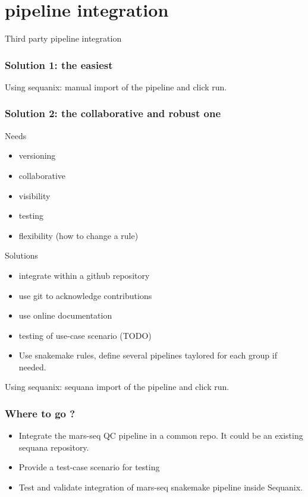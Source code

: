 \documentclass{beamer}
\begin{document}
\section{pipeline integration}

\begin{frame}[plain]
 \centering
 \begin{Huge}
 Third party pipeline integration
 \end{Huge}
\end{frame}


\begin{frame}
\frametitle{Solution 1: the easiest}
Using sequanix: manual import of the pipeline and click run.
\end{frame}

\begin{frame}
\frametitle{Solution 2: the collaborative and robust one}
\begin{block}{Needs}
 \begin{itemize}
  \item versioning
  \item collaborative
  \item visibility
  \item testing
  \item flexibility (how to change a rule)
 \end{itemize}
\end{block}

\begin{block}{Solutions}
 \begin{itemize}

\item integrate within a github repository
 \item use git to acknowledge contributions
 \item use online documentation
 \item testing of use-case scenario (TODO)
 \item Use snakemake rules, define several pipelines taylored for each group if 
needed.
 \end{itemize}
\end{block}
Using sequanix: sequana import of the pipeline and click run.
\end{frame}


\begin{frame}
 \frametitle{Where to go ?}
 \begin{itemize}
  \item Integrate the mars-seq QC pipeline in a common repo. It could be 
an existing sequana repository. 
  \item Provide a test-case scenario for testing
  \item Test and validate integration of mars-seq snakemake pipeline inside 
Sequanix.
 \end{itemize}

\end{frame}
\end{document}
